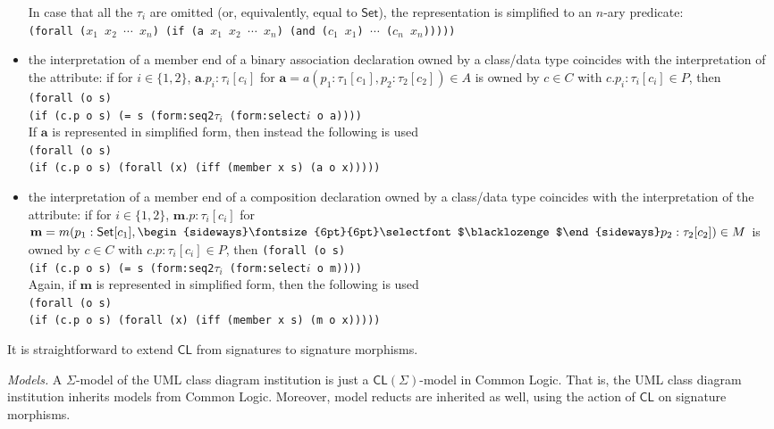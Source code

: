 \documentclass[10pt,fleqn,final]{scrreprt}
\newcommand*{\CL}{\ensuremath{\mathsf{CL}}\xspace}
\newenvironment{definitions}[0]{\medskip }{}
\newcommand{\composition}{\raisebox{0.2pt}{\begin{sideways}\fontsize{6pt}{6pt}\selectfont$\blacklozenge$\end{sideways}}}
\newcommand{\white}[1]{{\color{white}{#1}}}
\newcommand{\qqquad}{\white{x}\qquad}
\begin{document}
\begin{definitions}
\begin{itemize}
In case that all the $\tau_i$ are omitted (or, equivalently, equal to 
$\mathsf{Set}$), the representation is simplified to an $n$-ary predicate:\\
\texttt{(forall ($x_1$ $x_2$ $\cdots$  $x_n$) (if (a $x_1$ $x_2$ $\cdots$  $x_n$) (and ($c_1$ $x_1$) $\cdots$ ($c_n$ $x_n$)))))}
\item the interpretation of a member end of a binary association
declaration owned by a class/data type coincides with the interpretation
of the attribute: if for $i\in\{1,2\}$, $\mathbf{a}.p_i : \tau_i[c_i]$ for
$\mathbf{a} = a(p_1 : \tau_1[c_1], p_2 : \tau_2[c_2]) \in A$ is owned by
$c \in C$ with $c.p_i : \tau_i[c_i] \in P$, then\\
\texttt{(forall (o s)\\
\qqquad (if (c.p o s) (= s (form:seq2$\tau_i$ (form:select$i$ o a))))}\\
If $\mathbf{a}$ is represented in simplified form, then instead the following is used \\
\texttt{(forall (o s)\\
\qqquad (if (c.p o s) (forall (x) (iff (member x s) (a o x)))))}
\item the interpretation of a member end of a composition declaration
owned by a class/data type coincides with the interpretation of the
attribute: if for $i\in\{1,2\}$, $\mathbf{m}.p : \tau_i[c_i]$ for $\mathbf{m}=m(p_1 : \mathsf{Set}[c_1], \composition p_2 : \tau_2[c_2]) \in M$ is owned
by $c \in C$ with $c.p : \tau_i[c_i] \in P$, then
\texttt{(forall (o s)\\
\qqquad (if (c.p o s) (= s (form:seq2$\tau_i$ (form:select$i$ o m))))}\\
Again, if $\mathbf{m}$ is represented in simplified form, then the following is used\\
\texttt{(forall (o s)\\
\qqquad (if (c.p o s) (forall (x) (iff (member x s) (m o x)))))}
\end{itemize}


It is straightforward to extend $\CL$ from signatures to signature morphisms.

\smallskip\noindent
\textit{Models.}
A $\Sigma$-model of the UML class diagram institution is just a
$\CL(\Sigma)$-model in Common Logic. That is, the UML class diagram
institution inherits models from Common Logic. Moreover, model reducts
are inherited as well, using the action of $\CL$ on signature morphisms.



\end{definitions}
\end{document}
